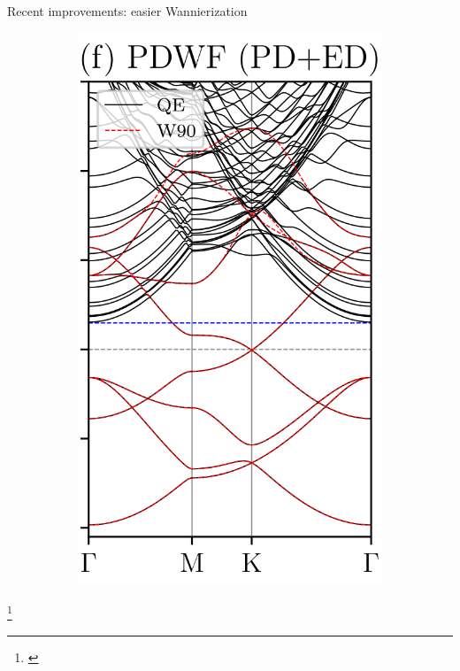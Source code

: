 \documentclass[xcolor=table,aspectratio=169]{beamer}
\newcommand\blfootcite[1]{%
  \begingroup
  \renewcommand\thefootnote{}\footnote{\hspace{-4ex}\cite{#1}}%
  \addtocounter{footnote}{-1}%
  \endgroup
}
\numberwithin{equation}{section}
\begin{document}
\begin{frame}{Recent improvements: easier Wannierization}
\begin{figure}[t]
\begin{subfigure}{0.225\textwidth}
         \includegraphics[height=1.5\columnwidth]{figures/proj_disentanglement_fig1f.png}
      \end{subfigure}
   \end{figure}


   \blfootcite{Qiao2023}

\end{frame}
\end{document}
